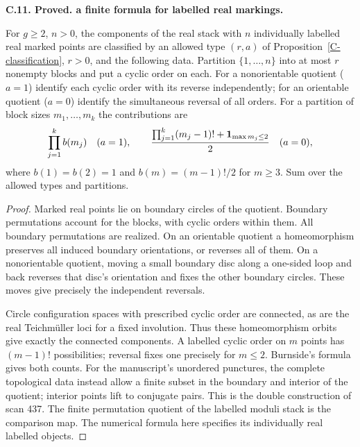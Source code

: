\documentclass[11pt,oneside]{article}
\makeatletter
\newcounter{statementanchor}
\newenvironment{statement}[3]{%
 \refstepcounter{statementanchor}\def\@currentlabel{#1}%
 \par\addvspace{9pt}\noindent
 \textbf{#1. #2. #3.}\par\nobreak\noindent\ignorespaces
}{\par\addvspace{5pt}}
\makeatother
\begin{document}
\begin{statement}{C.11}{Proved}{a finite formula for labelled real markings}
\label{st:C.11}
\label{C-marked-count}
For $g\geq2$, $n>0$, the components of the real
stack with $n$ individually labelled real marked
points are classified by an allowed type $(r,a)$
of Proposition~\ref{C-classification}, $r>0$,
and the following data.
Partition $\{1,\dots,n\}$ into at most $r$
nonempty blocks and put a cyclic order on each.
For a nonorientable quotient ($a=1$) identify
each cyclic order with its reverse independently;
for an orientable quotient ($a=0$) identify
the simultaneous reversal of all orders.
For a partition of block sizes $m_1,\dots,m_k$
the contributions are
\[
 \prod_{j=1}^k b(m_j)\quad(a=1),\qquad
 \frac{\prod_{j=1}^k(m_j-1)!+
              {\bf1}_{\max m_j\leq2}}2\quad(a=0),
\]
where $b(1)=b(2)=1$ and $b(m)=(m-1)!/2$ for $m\geq3$.
Sum over the allowed types and partitions.
\end{statement}
\begin{proof}
Marked real points lie on boundary circles of
the quotient. Boundary permutations account
for the blocks, with cyclic orders within
them. All boundary permutations are realized.
On an orientable quotient a homeomorphism
preserves all induced boundary orientations,
or reverses all of them. On a nonorientable
quotient, moving a small boundary disc along
a one-sided loop and back reverses that
disc's orientation and fixes the other
boundary circles. These moves give precisely
the independent reversals.

Circle configuration spaces with prescribed
cyclic order are connected, as are the real
Teichmüller loci for a fixed involution.
Thus these homeomorphism orbits give exactly
the connected components.
A labelled cyclic order on $m$ points has
$(m-1)!$ possibilities; reversal fixes one
precisely for $m\leq2$. Burnside's formula
gives both counts.
For the manuscript's unordered punctures,
the complete topological data instead
allow a finite subset in the boundary
and interior of the quotient; interior
points lift to conjugate pairs. This is
the double construction of scan 437.
The finite permutation quotient of the
labelled moduli stack is the comparison
map. The numerical formula here specifies
its individually real labelled objects.
\end{proof}
\end{document}
